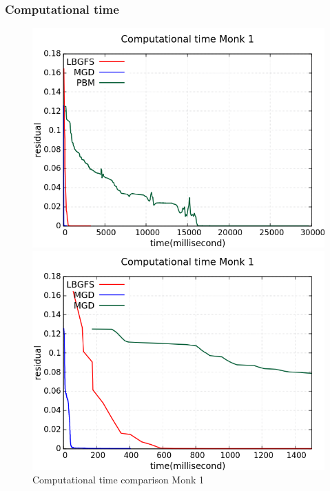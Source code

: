 \subsubsection{Computational time}
\begin{figure}[H]
	\centering
	\begin{minipage}[t]{0.5\linewidth}
		\includegraphics[width=\linewidth]{data/Comparison/Monk1/Monk1_CT_Comparison_standard.png}
	\end{minipage}%
	\begin{minipage}[t]{0.5\linewidth}
		\includegraphics[width=\linewidth]{data/Comparison/Monk1/Monk1_CT_Comparison_zoom.png}
	\end{minipage}
	\caption{Computational time comparison Monk 1}
	\label{CT-Monk1}
\end{figure}
